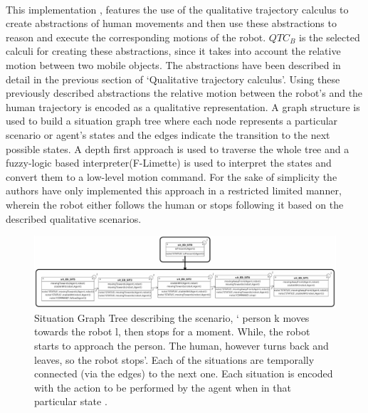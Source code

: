	 \paragraph{}This implementation \cite{bellotto2012robot}, features the use of the qualitative trajectory calculus to create abstractions of human movements and then use these abstractions to reason and execute the corresponding motions of the robot. $QTC_B$ is the selected calculi for creating these abstractions, since it takes into account the relative motion between two mobile objects. The abstractions have been described in detail in the previous section of `Qualitative trajectory calculus'. Using these previously described abstractions the relative motion between the robot's and the human trajectory is encoded as a qualitative representation. A graph structure is used to build a situation graph tree where each node represents a particular scenario or agent's states and the edges indicate the transition to the next possible states. A depth first approach is used to traverse the whole tree and a fuzzy-logic based interpreter(F-Limette) is used to  interpret the states and convert them to a low-level motion command. For the sake of simplicity the authors have only implemented this approach in a restricted limited manner, wherein the robot either follows the human or stops following it based on the described qualitative scenarios.
	\begin{figure}[h]
		\centering
		\includegraphics[scale = 0.6]{images/graph}
		\caption{Situation Graph Tree describing the scenario, ` person k moves towards the robot l,	then stops for a moment. While, the robot starts to approach the person. The human, however turns back and leaves, so the robot stops'. Each of the situations are temporally connected (via the edges) to the next one. Each situation is encoded with the action to be performed by the agent when in that particular state \cite{bellotto2012robot}.}
		\label{fig:graph}
	\end{figure}
	
